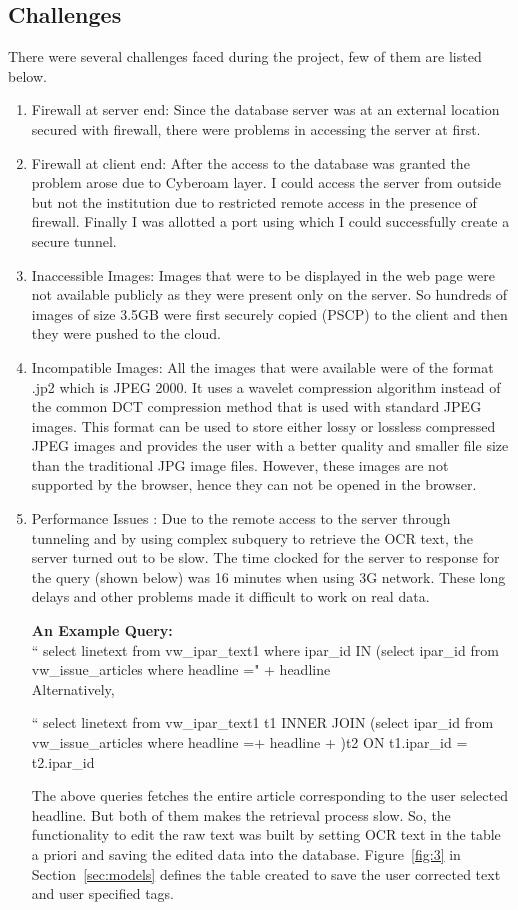 \documentclass[12pt]{article}
\begin{document}
\subsection{Challenges}
There were several challenges faced during the project, few of them are listed below.
\begin{enumerate}
\item Firewall at server end: Since the database server was at an external location secured with firewall, there were problems in accessing the server at first.
\item Firewall at client end: After the access to the database was granted the problem arose due to Cyberoam layer. I could access the server from outside but not the institution due to restricted remote access in the presence of firewall. Finally I was allotted a port using which I could successfully create a secure tunnel.
\item Inaccessible Images: Images that were to be displayed in the web page were not available publicly as they were present only on the server. So hundreds of images of size 3.5GB were first securely copied (PSCP) to the client and then they were pushed to the cloud.
\item Incompatible Images: All the images that were available were of the format .jp2 which is JPEG 2000. It uses a wavelet compression algorithm instead of the common DCT compression method that is used with standard JPEG images.
This format can be used to store either lossy or lossless compressed JPEG images and provides the user with a better quality and smaller file size than the traditional JPG image files.
However, these images are not supported by the browser, hence they can not be opened in the browser.
\item Performance Issues : Due to the remote access to the server through tunneling and by using complex subquery to retrieve the OCR text, the server turned out to be slow. The time clocked for the server to response for the query (shown below) was 16 minutes when using 3G network. These long delays and other problems made it difficult to work on real data. 

\textbf{An Example Query:} \\
`` select linetext from vw\_ipar\_text1 where ipar\_id IN (select  ipar\_id from vw\_issue\_articles where headline =" + headline \\

Alternatively,

`` select linetext from vw\_ipar\_text1 t1 INNER JOIN (select ipar\_id from vw\_issue\_articles where headline =\textasciigrave \textasciidieresis + headline + \textacutedbl\textasciiacute)t2 ON t1.ipar\_id = t2.ipar\_id \textasciidieresis 

The above queries fetches the entire article corresponding to the user selected headline. But both of them makes the retrieval process slow.
So, the functionality to edit the raw text was built by setting OCR text in the table a priori and saving the edited data into the database. Figure~\ref{fig:3} in Section~\ref{sec:models} defines the table created to save the user corrected text and user specified tags.

\end{enumerate}
\end{document}
